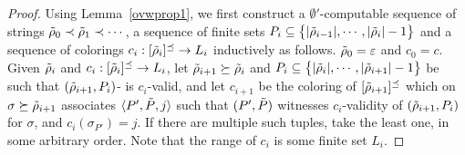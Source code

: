 \begin{proof}
Using Lemma~\ref{ovwprop1}, we first construct
a $\emptyset'$-computable sequence of strings
 $\tilde{\rho}_0 \prec \tilde{\rho}_1 \prec\cdots$,
a sequence of finite sets $P_i\subseteq \big\{
|\tilde{\rho}_{i-1}|,\cdots, |\tilde{\rho}_i|-1
\big\}$ and a sequence of colorings $c_i:[\tilde{\rho}_i]^\preceq\rightarrow
L_i$ inductively as follows.
$\tilde{\rho}_0 = \varepsilon$ and $c_0 = c$.
Given $\tilde{\rho}_i$ and $c_i:[\tilde{\rho}_i]^\preceq\rightarrow
L_i$, let $\tilde{\rho}_{i+1} \succeq \tilde{\rho}_i$
and $P_i\subseteq
\big\{ |\tilde{\rho}_i|,\cdots,|\tilde{\rho}_{i+1}|-1\big\}$ be such that
$(\tilde{\rho}_{i+1}, P_i)$- is $c_i$-valid,
and let $c_{i+1}$ be the coloring of $[\tilde{\rho}_{i+1}]^{\preceq}$ which on $\sigma \succeq \tilde{\rho}_{i+1}$
associates $\langle P', \tilde{P}, j \rangle$ such that
$(P',\tilde{P})$ witnesses $c_i$-validity of $(\tilde{\rho}_{i+1}, P_i)$
for $\sigma$, and $c_i(\sigma_{P'}) = j$. If there are multiple such tuples, take the least one, in some arbitrary order. Note that the range of $c_i$ is some finite set $L_i$.
%
%
%

\end{proof}
